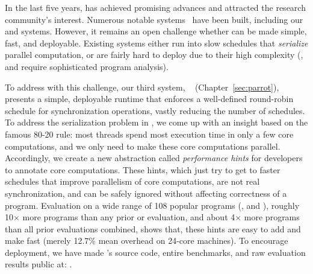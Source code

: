  In the last
five years, \smt has achieved promising advances and attracted the research
community's interest. Numerous notable \smt systems~\cite{determinator:osdi10,
cui:tern:osdi10, peregrine:sosp11, dthreads:sosp11, ics:oopsla13} have been
built, including our \tern and \peregrine systems. However, it remains an open
challenge whether \smt can be made simple, fast, and deployable. Existing \smt
systems either run into slow schedules that \emph{serialize} parallel
computation, or are fairly hard to deploy due to their high complexity (\eg,
\tern and \peregrine require sophisticated program analysis).

To address with this challenge, our third \smt system, 
\parrot~\cite{parrot:sosp13}
(Chapter~\ref{sec:parrot}), presents a simple, deployable runtime that enforces
a well-defined round-robin schedule for synchronization operations, vastly
reducing the number of schedules. To address the serialization problem in \smt,
we come up with an insight based on the famous 80-20 rule: most threads spend
most execution time in only a few core computations, and we only need to make 
these core computations parallel. Accordingly, we create a new abstraction
called \emph{performance hints} for developers to annotate core computations.
These hints, which just try to get to faster schedules that improve parallelism
of core computations, are not real synchronization, and can be safely ignored
without affecting correctness of a program. Evaluation on a wide range of 108
popular programs (\eg, \bdb and \mplayer), roughly 10$\times$ more programs than
any prior \smt or \dmt evaluation, and about 4$\times$ more programs than all
prior evaluations combined, shows that, these hints are easy to add and make
\parrot fast (merely 12.7\% mean overhead on 24-core machines). To encourage
deployment, we have made \parrot's source code, entire benchmarks, and raw
evaluation results public at: \github.

